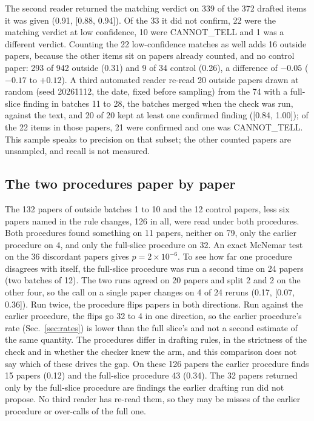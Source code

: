 \documentclass[reprint,amsmath,amssymb,aps,superscriptaddress,nofootinbib]{revtex4-2}
\begin{document}
The second reader returned the matching verdict on 339 of the 372 drafted items it was given (0.91, [0.88, 0.94]). Of the 33 it did not confirm, 22 were the matching verdict at low confidence, 10 were CANNOT\_TELL and 1 was a different verdict. Counting the 22 low-confidence matches as well adds 16 outside papers, because the other items sit on papers already counted, and no control paper: 293 of 942 outside (0.31) and 9 of 34 control (0.26), a difference of $-0.05$ ($-0.17$ to $+0.12$). A third automated reader re-read 20 outside papers drawn at random (seed 20261112, the date, fixed before sampling) from the 74 with a full-slice finding in batches 11 to 28, the batches merged when the check was run, against the text, and 20 of 20 kept at least one confirmed finding ([0.84, 1.00]); of the 22 items in those papers, 21 were confirmed and one was CANNOT\_TELL. This sample speaks to precision on that subset; the other counted papers are unsampled, and recall is not measured.

\subsection{The two procedures paper by paper}

The 132 papers of outside batches 1 to 10 and the 12 control papers, less six papers named in the rule changes, 126 in all, were read under both procedures. Both procedures found something on 11 papers, neither on 79, only the earlier procedure on 4, and only the full-slice procedure on 32. An exact McNemar test on the 36 discordant papers gives $p = 2\times10^{-6}$. To see how far one procedure disagrees with itself, the full-slice procedure was run a second time on 24 papers (two batches of 12). The two runs agreed on 20 papers and split 2 and 2 on the other four, so the call on a single paper changes on 4 of 24 reruns (0.17, [0.07, 0.36]). Run twice, the procedure flips papers in both directions. Run against the earlier procedure, the flips go 32 to 4 in one direction, so the earlier procedure's rate (Sec.~\ref{sec:rates}) is lower than the full slice's and not a second estimate of the same quantity. The procedures differ in drafting rules, in the strictness of the check and in whether the checker knew the arm, and this comparison does not say which of these drives the gap. On these 126 papers the earlier procedure finds 15 papers (0.12) and the full-slice procedure 43 (0.34). The 32 papers returned only by the full-slice procedure are findings the earlier drafting run did not propose. No third reader has re-read them, so they may be misses of the earlier procedure or over-calls of the full one.
\end{document}
